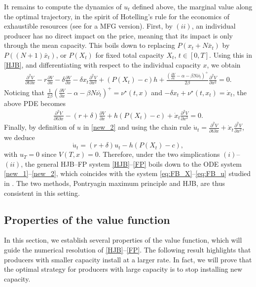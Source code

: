 \documentclass[12pt]{article}
\begin{document}
It remains to compute the dynamics of $u_t$ defined above, the marginal value along the optimal trajectory, in the spirit of Hotelling's rule for the economics of exhaustible resources (see \cite{chan2017fracking} for a MFG version). First, by $(ii)$, an individual producer has no direct impact on the price, meaning that its impact is only through the mean capacity. This boils down to replacing $P(x_t + N\bar{x}_t)$ by $P((N+1)\bar{x}_t)$, or $P(X_t)$ for fixed total capacity $X_t$, $t \in [0,T]$. Using this in \eqref{HJB}, and differentiating with respect to the individual capacity $x$, we obtain   
\begin{align*}
\frac{\partial^2 V}{\partial t \partial x}-r\frac{\partial V}{\partial x}-\delta \frac{\partial V}{\partial x}-\delta x_t\frac{\partial^2 V}{\partial x^2}+(P(X_t)-c)h+\frac{\left(\frac{\partial V}{\partial x}-\alpha-\beta N\bar{\nu_t} \right)^+}{2\beta}\frac{\partial ^2V}{\partial x^2}=0.
\end{align*}
Noticing that $\frac{1}{2\beta} \left(\frac{\partial V}{\partial x}-\alpha-\beta N\bar{\nu_t} \right)^+=\nu^\star(t,x)$ and $-\delta x_t+\nu^\star(t,x_t)=\dot{x}_t$, the above PDE becomes 
\begin{align*}
\frac{\partial^2 V}{\partial t \partial x}-(r+\delta)\frac{\partial V}{\partial x}+h(P(X_t)-c)+\dot{x}_t\frac{\partial ^2 V}{\partial x^2}=0.
\end{align*}
Finally, by definition of $u$ in \eqref{new_2} and using the chain rule $\dot{u}_t=\frac{\partial^2 V}{\partial t\partial x}+\dot{x}_t\frac{\partial^2V}{\partial x^2} $, we deduce 
\begin{equation}\label{new_1}
\dot{u}_t=(r+\delta)u_t-h(P(X_t)-c),
\end{equation}
with $u_T=0$ since $V(T,x)=0$. Therefore, under the two simplications $(i)$--$(ii)$, the general HJB--FP system \eqref{HJB}--\eqref{FP} boils down to the ODE system \eqref{new_1}--\eqref{new_2}, which coincides with the system \eqref{eq:FB_X}--\eqref{eq:FB_u} studied in . The two methods, Pontryagin maximum principle and HJB, are thus consistent in this setting.

\subsection{Properties of the value function}\label{properties}
In this section, we establish several properties of the value function, which will guide the numerical resolution of \eqref{HJB}--\eqref{FP}. The following result highlights that producers with smaller capacity install at a larger rate. In fact, we will prove that the optimal strategy for producers with large capacity is to stop installing new capacity.
\end{document}
